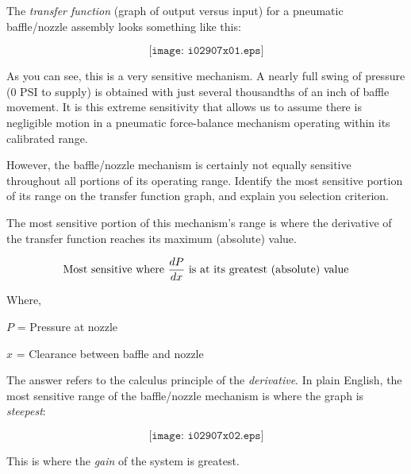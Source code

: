

The {\it transfer function} (graph of output versus input) for a pneumatic baffle/nozzle assembly looks something like this:

$$\texttt{[image: i02907x01.eps]}$$

As you can see, this is a very sensitive mechanism.  A nearly full swing of pressure (0 PSI to supply) is obtained with just several thousandths of an inch of baffle movement.  It is this extreme sensitivity that allows us to assume there is negligible motion in a pneumatic force-balance mechanism operating within its calibrated range.

However, the baffle/nozzle mechanism is certainly not equally sensitive throughout all portions of its operating range.  Identify the most sensitive portion of its range on the transfer function graph, and explain you selection criterion.







The most sensitive portion of this mechanism's range is where the derivative of the transfer function reaches its maximum (absolute) value.

$$\hbox{Most sensitive where } {dP \over dx} \hbox{ is at its greatest (absolute) value}$$

\noindent
Where,

$P$ = Pressure at nozzle

$x$ = Clearance between baffle and nozzle

\vskip 10pt

The answer refers to the calculus principle of the {\it derivative}.  In plain English, the most sensitive range of the baffle/nozzle mechanism is where the graph is {\it steepest}:

$$\texttt{[image: i02907x02.eps]}$$

This is where the {\it gain} of the system is greatest.











